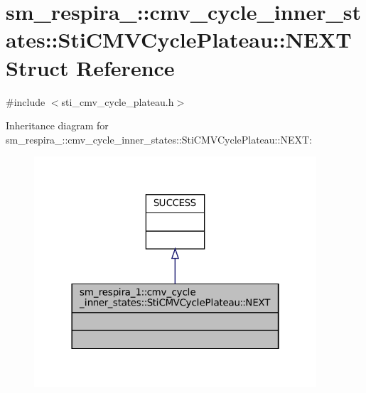 \hypertarget{structsm__respira__1_1_1cmv__cycle__inner__states_1_1StiCMVCyclePlateau_1_1NEXT}{}\section{sm\+\_\+respira\+\_\+:\+:cmv\+\_\+cycle\+\_\+inner\+\_\+states\+:\+:Sti\+C\+M\+V\+Cycle\+Plateau\+:\+:N\+E\+XT Struct Reference}
\label{structsm__respira__1_1_1cmv__cycle__inner__states_1_1StiCMVCyclePlateau_1_1NEXT}


{\ttfamily \#include $<$sti\+\_\+cmv\+\_\+cycle\+\_\+plateau.\+h$>$}



Inheritance diagram for sm\+\_\+respira\+\_\+:\+:cmv\+\_\+cycle\+\_\+inner\+\_\+states\+:\+:Sti\+C\+M\+V\+Cycle\+Plateau\+:\+:N\+E\+XT\+:
\nopagebreak
\begin{figure}[H]
\begin{center}
\leavevmode
\includegraphics[width=298pt]{structsm__respira__1_1_1cmv__cycle__inner__states_1_1StiCMVCyclePlateau_1_1NEXT__inherit__graph}
\end{center}
\end{figure}


